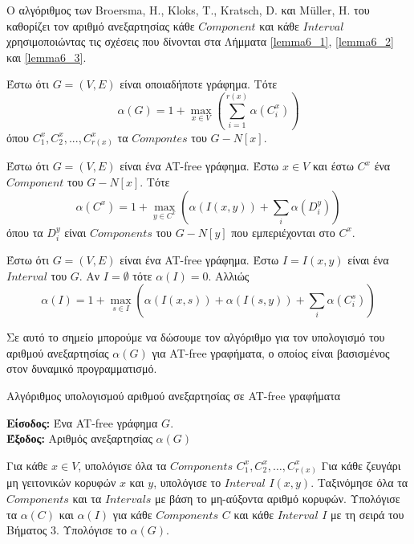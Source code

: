 Ο αλγόριθμος των Broersma, H., Kloks, T., Kratsch, D. και Müller, H. του καθορίζει τον αριθμό ανεξαρτησίας κάθε $Component$ και κάθε $Interval$ χρησιμοποιώντας τις σχέσεις που δίνονται στα Λήμματα \ref{lemma6_1}, \ref{lemma6_2} και \ref{lemma6_3}.

\begin{lemma}
	\label{lemma6_1}
	Έστω ότι $G = (V,E)$ είναι οποιαδήποτε γράφημα. 
	Τότε $$\alpha(G)=1+\max_{x\in V}\left(\sum_{i=1}^{r(x)}\alpha(C_i^x)\right)$$ όπου  $C_1^x, C_2^x,...,C_{r(x)}^x$ τα $Compontes$ του $G - N[x]$.
\end{lemma}

\begin{lemma}
	\label{lemma6_2}
	Έστω ότι $G = (V,E)$ είναι ένα AT-free γράφημα. Έστω $x \in V$ και έστω $C^x$ ένα $Component$ του $G - N[x]$. Τότε $$\alpha(C^x)=1+\max_{y\in C^x}\left(\alpha(I(x,y))+\sum_{i}\alpha(D_i^y)\right)$$ όπου τα $D_i^y$ είναι $Components$ του $G - N[y]$ που εμπεριέχονται στο $C^x$. 
\end{lemma}

\begin{lemma}
	\label{lemma6_3}
	Έστω ότι $G = (V,E)$ είναι ένα AT-free γράφημα. Έστω $I = I(x,y)$ είναι ένα $Interval$ του $G$. Αν $I = \emptyset$ τότε $\alpha(I) = 0$. Αλλιώς $$\alpha(I)=1+\max_{s\in I}\left(\alpha(I(x,s))+\alpha(I(s,y))+\sum_{i}\alpha(C_i^s)\right)$$
\end{lemma}

Σε αυτό το σημείο μπορούμε να δώσουμε τον αλγόριθμο για τον υπολογισμό του αριθμού ανεξαρτησίας $\alpha(G)$ για AT-free γραφήματα, ο οποίος είναι βασισμένος στον δυναμικό προγραμματισμό. 

\begin{algorithm}[H]
	\caption{Αλγόριθμος υπολογισμού αριθμού ανεξαρτησίας σε AT-free γραφήματα}
	\label{alg:indep-set}
	
	\hspace*{\algorithmicindent} \textbf{Είσοδος:} Ένα AT-free γράφημα $G$.\\
	
	\hspace*{\algorithmicindent} \textbf{Έξοδος:} Αριθμός ανεξαρτησίας $\alpha(G)$
	
	\begin{algorithmic}[1]
		
		\STATE Για κάθε $x \in V$, υπολόγισε όλα τα $Components$ $C_1^x , C_2^x , \ldots , C_{r(x)}^x$
		\STATE Για κάθε ζευγάρι μη γειτονικών κορυφών $x$ και $y$, υπολόγισε το $Interval$ $I(x, y)$.
		\STATE Ταξινόμησε όλα τα $Components$ και τα $Intervals$ με βάση το μη-αύξοντα αριθμό κορυφών.
		\STATE Υπολόγισε τα $\alpha(C)$ και $\alpha(I)$ για κάθε $Components$ $C$ και κάθε $Interval$ $I$ με τη σειρά του Βήματος 3.
		\STATE Υπολόγισε το $\alpha(G)$.
		
	\end{algorithmic}
\end{algorithm}

